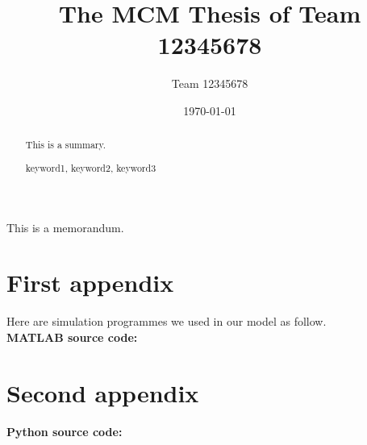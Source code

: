 \documentclass{mcmthsis}  %
\title{The MCM Thesis of Team 12345678}  %
\author{\small Team 12345678}  %
\date{\today}  %
\begin{document}
\begin{abstract}  %
This is a summary.
\begin{keywords}  %
keyword1, keyword2, keyword3
\end{keywords}  %
\end{abstract}  %
\maketitle  %
\tableofcontents  %



\newpage  %










\newpage
\printbibliography  %


\newpage
\begin{appendices}  %

\begin{memo}[Memorandum]  %
	This is a memorandum.
\end{memo}  %

\section{First appendix}  %

Here are simulation programmes we used in our model as follow.\\
\textbf{MATLAB source code:}


\section{Second appendix}  %

\textbf{Python source code:}


\end{appendices}  %
\end{document}

